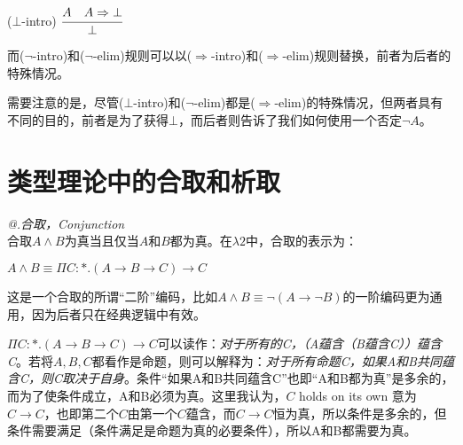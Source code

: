 \documentclass[UTF8]{article}
\makeatletter
\newcommand{\Rmnum}[1]{\expandafter\@slowromancap\romannumeral #1@}
\makeatother
\begin{document}
		($\bot$-intro) $\cfrac{A\ \ \ A\Rightarrow\bot}{\bot}$
		
		而($\neg$-intro)和($\neg$-elim)规则可以以($\Rightarrow$-intro)和($\Rightarrow$-elim)规则替换，前者为后者的特殊情况。
		
		需要注意的是，尽管($\bot$-intro)和($\neg$-elim)都是($\Rightarrow$-elim)的特殊情况，但两者具有不同的目的，前者是为了获得$\bot$，而后者则告诉了我们如何使用一个否定$\neg A$。
		
	\section{类型理论中的合取和析取}
	\noindent
	\textit{\Rmnum{1}.合取，Conjunction}\\
	合取$A\land B$为真当且仅当$A$和$B$都为真。在$\lambda{2}$中，合取的表示为：
	
		$A\land B\equiv\Pi C:*.(A\rightarrow B\rightarrow C)\rightarrow C$
		
		这是一个合取的所谓“二阶”编码，比如$A\land B\equiv\neg(A\rightarrow\neg B)$的一阶编码更为通用，因为后者只在经典逻辑中有效。
		
		$\Pi C:*.(A\rightarrow B\rightarrow C)\rightarrow C$可以读作：\textit{对于所有的C，（A蕴含（B蕴含C））蕴含C}。若将$A,B,C$都看作是命题，则可以解释为：\textit{对于所有命题C，如果A和B共同蕴含C，则C取决于自身}。条件“如果A和B共同蕴含C”也即“A和B都为真”是多余的，而为了使条件成立，A和B必须为真。这里我认为，$C$ holds on its own 意为 $C\rightarrow C$，也即第二个$C$由第一个$C$蕴含，而$C\rightarrow C$恒为真，所以条件是多余的，但条件需要满足（条件满足是命题为真的必要条件），所以A和B都需要为真。
\end{document}
